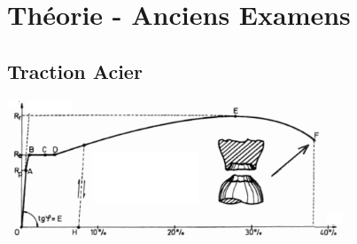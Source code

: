 \documentclass[a4paper]{article}
\begin{document}
\section{Théorie - Anciens Examens}





\subsection{Traction Acier}





\begin{center}
\includegraphics[width=0.75\textwidth]{images/CourbeAcier.PNG}
\end{center}
\end{document}
